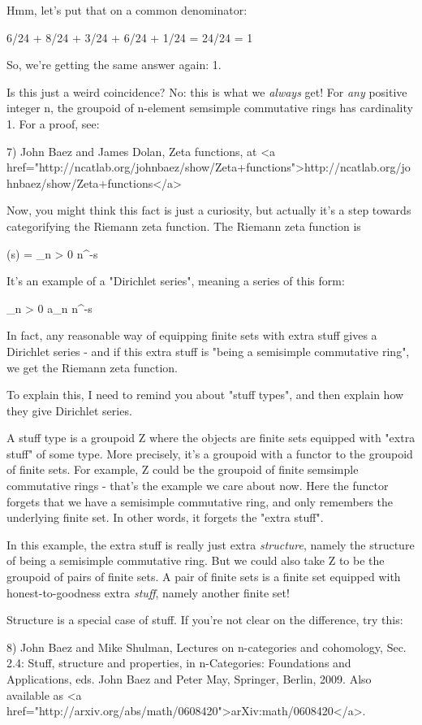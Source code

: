 Hmm, let's put that on a common denominator:

6/24 + 8/24 + 3/24 + 6/24 + 1/24 = 24/24 = 1

So, we're getting the same answer again: 1.

Is this just a weird coincidence?  No: this is what we \emph{always} get!  For \emph{any} positive integer n, the groupoid of n-element semsimple commutative rings has cardinality 1.  For a proof, see:

7) John Baez and James Dolan, Zeta functions, at <a
href="http://ncatlab.org/johnbaez/show/Zeta+functions">http://ncatlab.org/johnbaez/show/Zeta+functions</a>

Now, you might think this fact is just a curiosity, but actually it's
a step towards categorifying the Riemann zeta function.  The Riemann
zeta function is

\zeta (s) = \sum_{n > 0} n^{-s}

It's an example of a "Dirichlet series", meaning a series of this form:

\sum_{n > 0} a_{n} n^{-s}

In fact, any reasonable way of equipping finite sets with extra stuff
gives a Dirichlet series - and if this extra stuff is "being a
semisimple commutative ring", we get the Riemann zeta function.

To explain this, I need to remind you about "stuff types", and then
explain how they give Dirichlet series.

A stuff type is a groupoid Z where the objects are finite sets
equipped with "extra stuff" of some type.  More precisely, it's a
groupoid with a functor to the groupoid of finite sets.  For example,
Z could be the groupoid of finite semsimple commutative rings - that's
the example we care about now.  Here the functor forgets that we have
a semisimple commutative ring, and only remembers the underlying
finite set.  In other words, it forgets the "extra stuff".

In this example, the extra stuff is really just extra
\emph{structure}, namely the structure of being a semisimple
commutative ring.  But we could also take Z to be the groupoid of
pairs of finite sets.  A pair of finite sets is a finite set equipped
with honest-to-goodness extra \emph{stuff}, namely another finite set!

Structure is a special case of stuff.  If you're not clear on the
difference, try this:

8) John Baez and Mike Shulman, Lectures on n-categories and
cohomology, Sec. 2.4: Stuff, structure and properties, in
n-Categories: Foundations and Applications, eds. John Baez and Peter
May, Springer, Berlin, 2009.  Also available as <a
href="http://arxiv.org/abs/math/0608420">arXiv:math/0608420</a>.

